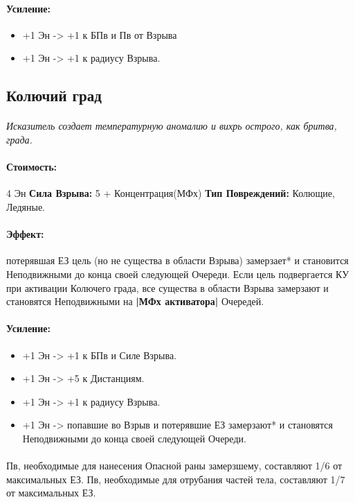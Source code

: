 \paragraph{Усиление:}
\begin{itemize}
\item+1 Эн -> +1 к БПв и Пв от Взрыва
\item+1 Эн -> +1 к радиусу Взрыва.
\end{itemize}
\subsection{Колючий град}
\paragraph{} 
\textit{Исказитель создает температурную аномалию и вихрь острого, как бритва, града.}
\paragraph{Стоимость: }4 Эн
\newline
\textbf{Сила Взрыва: }5 + Концентрация(МФх)
\newline
\textbf{Тип Повреждений: }Колющие, Ледяные.
\paragraph{Эффект: }потерявшая ЕЗ цель (но не существа в области Взрыва) замерзает* и становится Неподвижными до конца своей следующей Очереди. 
\newline Если цель подвергается КУ при активации Колючего града, все существа в области Взрыва замерзают и становятся Неподвижными на 
\textbf{|МФх активатора|} Очередей.
\paragraph{Усиление:}
\begin{itemize}
\item+1 Эн -> +1 к БПв и Силе Взрыва.
\item+1 Эн -> +5 к Дистанциям.
\item+1 Эн -> +1 к радиусу Взрыва.
\item+1 Эн -> попавшие во Взрыв и потерявшие ЕЗ замерзают* и становятся Неподвижными до конца своей следующей Очереди.
\end{itemize}
\paragraph{}Пв, необходимые для нанесения Опасной раны замерзшему, составляют 1/6 от максимальных ЕЗ. Пв, необходимые для отрубания частей тела, составляют 1/7 от максимальных ЕЗ.
